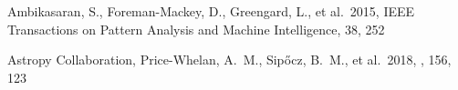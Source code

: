 \documentclass[twocolumn, twocolappendix]{aastex63}
\begin{document}

\begin{thebibliography}{}


















 Ambikasaran, S., Foreman-Mackey, D., Greengard, L., et al.\ 2015, IEEE Transactions on Pattern Analysis and Machine Intelligence, 38, 252










 Astropy Collaboration, Price-Whelan, A.~M., Sip{\H{o}}cz, B.~M., et al.\ 2018, \aj, 156, 123



\end{thebibliography}
\end{document}

